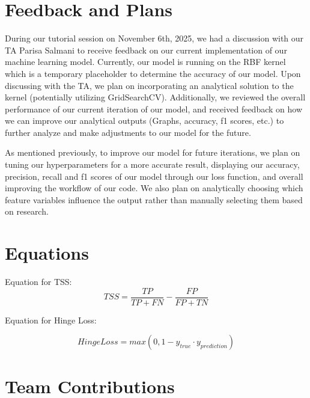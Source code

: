 \documentclass[11pt]{article}
\begin{document}
\section{Feedback and Plans}

During our tutorial session on November 6th, 2025, we had a discussion with our TA Parisa Salmani to receive feedback on our current implementation of our machine learning model. Currently, our model is running on the RBF kernel which is a temporary placeholder to determine the accuracy of our model. Upon discussing with the TA, we plan on incorporating an analytical solution to the kernel (potentially utilizing GridSearchCV). Additionally, we reviewed the overall performance of our current iteration of our model, and received feedback on how we can improve our analytical outputs (Graphs, accuracy, f1 scores, etc.) to further analyze and make adjustments to our model for the future.

As mentioned previously, to improve our model for future iterations, we plan on tuning our hyperparameters for a more accurate result, displaying our accuracy, precision, recall and f1 scores of our model through our loss function, and overall improving the workflow of our code. We also plan on analytically choosing which feature variables influence the output rather than manually selecting them based on research. 

\nocite{cdc, tasinetal, abnoosianetal, DHARMARATHNE2024100301, CERVANTES2020189}

\section{Equations}

Equation for TSS:
\begin{equation}
  \label{eq:tss}
  TSS = \frac{TP}{TP + FN} - \frac{FP}{FP + TN}
\end{equation}

Equation for Hinge Loss:

\begin{equation}
    \label{eq:hl}
    Hinge Loss = max(0, 1 - y_{true} \cdot y_{prediction})
\end{equation}


\section*{Team Contributions}
\end{document}
